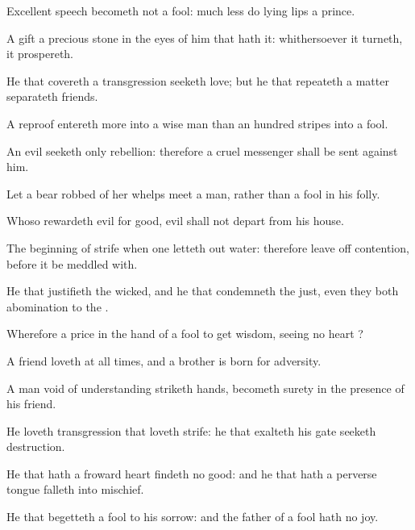 {Excellent
speech
becometh not a
fool: much less do
lying
lips a
prince.

A
gift
{} a
precious
stone in the
eyes of him that
hath it: whithersoever it
turneth, it
prospereth.

He that
covereth a
transgression
seeketh
love; but he that
repeateth a
matter
separateth
{}
friends.

A
reproof
entereth more into a wise
man than an
hundred
stripes into a
fool.

An
evil
{}
seeketh only
rebellion: therefore a
cruel
messenger shall be
sent against him.

Let a
bear
robbed of her whelps
meet a
man, rather
than a
fool in his
folly.

Whoso
rewardeth
evil for
good,
evil shall not
depart from his
house.

The
beginning of
strife
{} when one letteth
out
water: therefore leave
off
contention,
before it be
meddled with.

He that
justifieth the
wicked, and he that
condemneth the
just, even they
both
{}
abomination to the
{}.

Wherefore
{} a
price in the
hand of a
fool to
get
wisdom, seeing
{} no
heart
{}?

A
friend
loveth at all
times, and a
brother is
born for
adversity.

A
man
void of
understanding
striketh
hands,
{}
becometh
surety in the
presence of his
friend.

He
loveth
transgression that
loveth
strife:
{} he that
exalteth his
gate
seeketh
destruction.

He that hath a
froward
heart
findeth no
good: and he that hath a
perverse
tongue
falleth into
mischief.

He that
begetteth a
fool
{} to his
sorrow: and the
father of a
fool hath no
joy.

}
